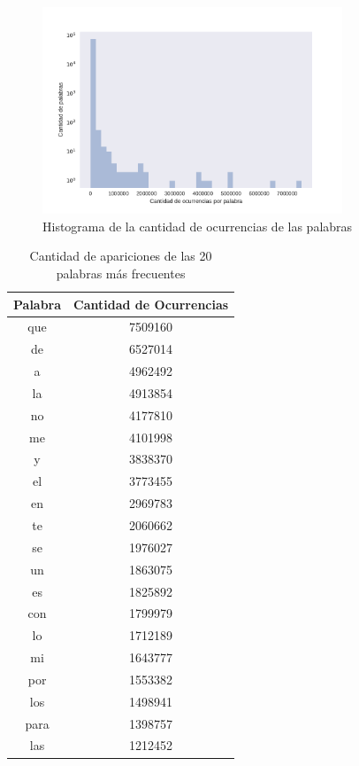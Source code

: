 \begin{figure}[ht]
\centering
\includegraphics[width=0.8\textwidth]{./images/DistribucionOcurrenciasPalabras.pdf} 
\caption{Histograma de la cantidad de ocurrencias de las palabras} 
\label{fig:cantPalabras} 
\end{figure}

\begin{table}[ht]
\centering
\label{tab:palabrasMasOcurrentes}
\begin{tabular}{|c|c|}
\hline
Palabra & Cantidad de Ocurrencias \\ \hline
que     & 7509160                 \\
de      & 6527014                 \\
a       & 4962492                 \\
la      & 4913854                 \\
no      & 4177810                 \\
me      & 4101998                 \\
y       & 3838370                 \\
el      & 3773455                 \\
en      & 2969783                 \\
te      & 2060662                 \\
se      & 1976027                 \\
un      & 1863075                 \\
es      & 1825892                 \\
con     & 1799979                 \\
lo      & 1712189                 \\
mi      & 1643777                 \\
por     & 1553382                 \\
los     & 1498941                 \\
para    & 1398757                 \\
las     & 1212452                 \\
\hline
\end{tabular}
\caption{Cantidad de apariciones de las 20 palabras más frecuentes}

\end{table}

